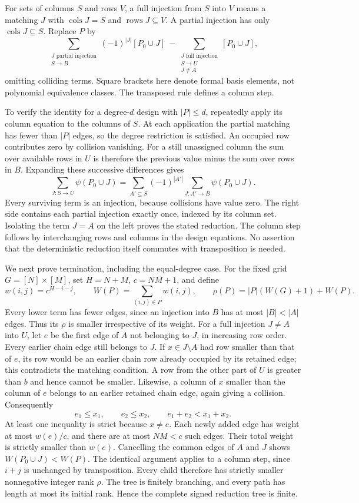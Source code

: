 \documentclass[11pt,a4paper]{article}
\theoremstyle{definition}\newtheorem{definition}[theorem]{Definition}
\theoremstyle{remark}\newtheorem{remark}[theorem]{Remark}
\begin{document}
For sets of columns $S$ and rows $V$, a full injection from $S$ into $V$
means a matching $J$ with $\operatorname{cols}J=S$ and
$\operatorname{rows}J\subseteq V$.  A partial injection has only
$\operatorname{cols}J\subseteq S$.  Replace $P$ by
\[
 \sum_{\substack{J\text{ partial injection}\\S\to B}}
       (-1)^{|J|}[P_0\cup J]
 \ -\!
 \sum_{\substack{J\text{ full injection}\\S\to U\\J\ne A}}
       [P_0\cup J],
\]
omitting colliding terms.  Square brackets here denote formal basis
elements, not polynomial equivalence classes.  The transposed rule defines
a column step.

To verify the identity for a degree-$d$ design with $|P|\leq d$, repeatedly
apply its column equation to the columns of $S$.  At each application
the partial matching has fewer than $|P|$ edges, so the degree restriction
is satisfied.  An occupied row contributes zero by collision vanishing.
For a still unassigned column the sum over available rows in $U$ is
therefore the previous value minus the sum over rows in $B$.  Expanding
these successive differences gives
\[
 \sum_{J:S\to U}\psi(P_0\cup J)
  =\sum_{A'\subseteq S}(-1)^{|A'|}
       \sum_{J:A'\to B}\psi(P_0\cup J).
\]
Every surviving term is an injection, because collisions have value zero.
The right side contains each partial injection exactly once, indexed by
its column set.  Isolating the term $J=A$ on the left proves the stated
reduction.  The column step follows by interchanging rows and columns in
the design equations.  No assertion that the deterministic reduction
itself commutes with transposition is needed.

We next prove termination, including the equal-degree case.  For the
fixed grid $G=[N]\times[M]$, set $H=N+M$, $c=NM+1$, and define
\[
 w(i,j)=c^{H-i-j},\qquad W(P)=\sum_{(i,j)\in P}w(i,j),\qquad
 \rho(P)=|P|(W(G)+1)+W(P).
\]
Every lower term has fewer edges, since an injection into $B$ has at most
$|B|<|A|$ edges.  Thus its $\rho$ is smaller irrespective of its weight.
For a full injection $J\ne A$ into $U$, let $e$ be the first edge of $A$
not belonging to $J$, in increasing row order.  Every earlier chain edge
still belongs to $J$.  If $x\in J\setminus A$ had row smaller than that
of $e$, its row would be an earlier chain row already occupied by its
retained edge; this contradicts the matching condition.  A row from the
other part of $U$ is greater than $b$ and hence cannot be smaller.
Likewise, a column of $x$ smaller than the column of $e$ belongs to an
earlier retained chain edge, again giving a collision.  Consequently
\[
 e_1\leq x_1,\qquad e_2\leq x_2,\qquad e_1+e_2<x_1+x_2.
\]
At least one inequality is strict because $x\ne e$.  Each newly added
edge has weight at most $w(e)/c$, and there are at most $NM<c$ such
edges.  Their total weight is strictly smaller than $w(e)$.  Cancelling
the common edges of $A$ and $J$ shows $W(P_0\cup J)<W(P)$.
The identical argument applies to a column step, since $i+j$ is
unchanged by transposition.  Every child therefore has strictly smaller
nonnegative integer rank $\rho$.  The tree is finitely branching, and
every path has length at most its initial rank.  Hence the complete
signed reduction tree is finite.
\end{document}
